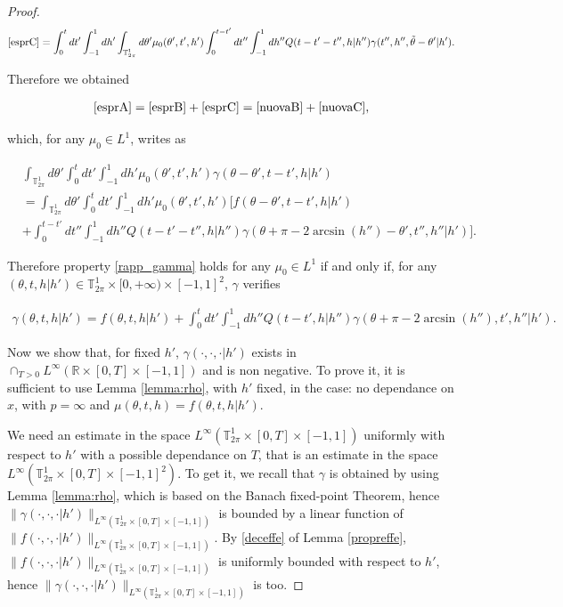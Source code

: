 \documentclass[a4paper,10pt,reqno]{amsart}
\numberwithin{equation}{subsection}
\numberwithin{figure}{subsection}
\begin{document}
\begin{proof}
 {\scriptsize\begin{align}
\label{nuovaC}\eqref{esprC}=\int_0^tdt'\int_{-1}^1dh'\int_{\mathbb{T}^1_{2\pi}}d\theta'\mu_0(\theta',t',h')\int_0^{t-t'}dt''\int_{-1}^1dh''Q(t-t'-t'',h|h'')\gamma(t'',h'',\tilde\theta-\theta'|h').
\end{align}}

Therefore we obtained

\begin{align*}
\eqref{esprA}=\eqref{esprB}+\eqref{esprC}=\eqref{nuovaB}+\eqref{nuovaC},
\end{align*}

which, for any $\mu_0\in L^1$, writes as

\begin{align*}
&\int_{\mathbb{T}^1_{2\pi}}d\theta'\int_0^tdt'\int_{-1}^1dh'\mu_0(\theta',t',h')\gamma(\theta-\theta',t-t',h|h')
\\
&=\int_{\mathbb{T}^1_{2\pi}}d\theta'\int_0^tdt'\int_{-1}^1dh'\mu_0(\theta',t',h')\biggl[f(\theta-\theta',t-t',h|h')
\\
&+\int_0^{t-t'}dt''\int_{-1}^1dh''Q(t-t'-t'',h|h'')\gamma(\theta+\pi-2\arcsin(h'')-\theta',t'',h''|h')\biggr].
\end{align*}

Therefore property \eqref{rapp_gamma} holds for any $\mu_0\in L^1$ if and only if, for any $(\theta,t,h|h')\in\mathbb{T}^1_{2\pi}\times[0,+\infty)\times[-1,1]^2$, $\gamma$ verifies

{\small\begin{align}
\label{espr:gamma}\gamma(\theta,t,h|h')=f(\theta,t,h|h')+\int_0^tdt'\int_{-1}^1dh''Q(t-t',h|h'')\gamma(\theta+\pi-2\arcsin(h''),t',h''|h').
\end{align}}

Now we show that, for fixed $h'$, $\gamma(\cdot,\cdot,\cdot|h')$ exists in $\cap_{T>0}L^{\infty}(\mathbb{R}\times[0,T]\times[-1,1])$ and is non negative. To prove it, it is sufficient to use Lemma \ref{lemma:rho}, with $h'$ fixed, in the case: no dependance on $x$, with $p=\infty$ and $\mu(\theta,t,h)=f(\theta,t,h|h')$.

We need an estimate in the space $L^{\infty}(\mathbb{T}^1_{2\pi}\times[0,T]\times[-1,1])$ uniformly with respect to $h'$ with a possible dependance on $T$, that is an estimate in the space $L^{\infty}(\mathbb{T}^1_{2\pi}\times[0,T]\times[-1,1]^2)$. To get it, we recall that $\gamma$ is obtained by using Lemma \ref{lemma:rho}, which is based on the Banach fixed-point Theorem, hence $\|\gamma(\cdot,\cdot,\cdot|h')\|_{L^{\infty}(\mathbb{T}^1_{2\pi}\times[0,T]\times[-1,1])}$ is bounded by a linear function of $\|f(\cdot,\cdot,\cdot|h')\|_{L^{\infty}(\mathbb{T}^1_{2\pi}\times[0,T]\times[-1,1])}$. By \eqref{deceffe} of Lemma \ref{propreffe}, $\|f(\cdot,\cdot,\cdot|h')\|_{L^{\infty}(\mathbb{T}^1_{2\pi}\times[0,T]\times[-1,1])}$ is uniformly bounded with respect to $h'$, hence $\|\gamma(\cdot,\cdot,\cdot|h')\|_{L^{\infty}(\mathbb{T}^1_{2\pi}\times[0,T]\times[-1,1])}$ is too. 


\end{proof}
\end{document}
